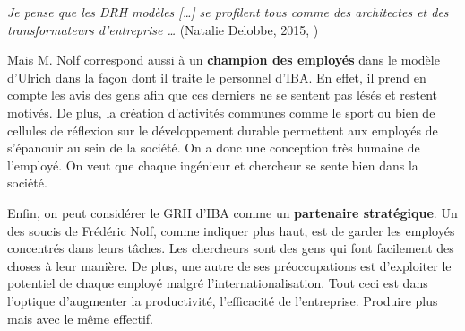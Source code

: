 \og{} \textit{Je pense que les DRH modèles [\ldots] se profilent tous comme 
des architectes et des transformateurs d’entreprise \ldots} \fg{} (Natalie Delobbe, 2015, \cite{tableronde}) \newline

Mais M. Nolf correspond aussi à un \textbf{champion des employés} dans le modèle d'Ulrich dans la façon dont il traite le personnel d'IBA. En effet, il prend en compte les avis des gens afin que ces derniers ne se sentent pas lésés et restent motivés. De plus, la création d'activités communes comme le sport ou bien de cellules de réflexion sur le développement durable permettent aux employés de s'épanouir au sein de la société. On a donc une conception très humaine de l'employé. On veut que chaque ingénieur et chercheur se sente bien dans la société. \newline

Enfin, on peut considérer le GRH d'IBA comme un \textbf{partenaire stratégique}. Un des soucis de Frédéric Nolf, comme indiquer plus haut, est de garder les employés concentrés dans leurs tâches. Les chercheurs sont des gens qui font facilement des choses à leur manière. De plus, une autre de ses préoccupations est d'exploiter le potentiel de chaque employé malgré l'internationalisation. Tout ceci est dans l'optique d'augmenter la productivité, l'efficacité de l'entreprise. Produire plus mais avec le même effectif. 



